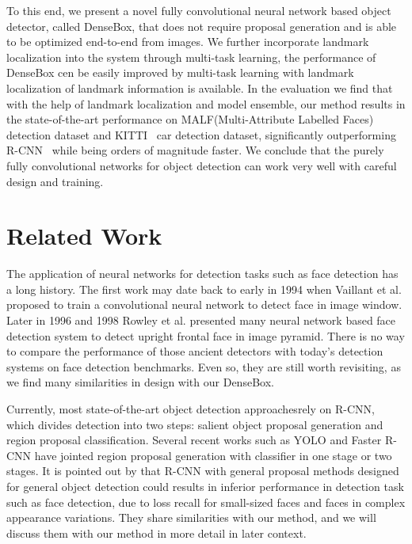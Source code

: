 To this end, we present a novel fully convolutional neural network based object detector, called DenseBox, that does not require proposal generation and is able to be optimized end-to-end from images. We further incorporate landmark localization into the system through multi-task learning, the performance of DenseBox cen be easily improved by multi-task learning with landmark localization of landmark information is available.  In the evaluation we find that with the help of landmark localization and model ensemble, our method results in the state-of-the-art performance on MALF(Multi-Attribute Labelled Faces)~\cite{faceevaluation15} detection dataset and KITTI~\cite{Geiger2012CVPR} car detection dataset, significantly outperforming R-CNN~\cite{} while being orders of magnitude faster. We conclude that the purely fully convolutional networks for object detection can work very well with careful design and training. 

\section{Related Work}

 


The application of neural networks for detection tasks such as face detection has a long history. The first work may date back to early in 1994 when Vaillant et al.\cite{vaillant1994original} proposed to train a convolutional neural network to detect face in image window.  Later in 1996 and 1998 Rowley et al.\cite{rowley1998neural,rowley1998rotation} presented many neural network based face detection system to detect upright frontal face in image pyramid. There is no way to compare the performance of those ancient detectors with today’s detection systems on face detection benchmarks. Even so, they are still worth revisiting, as we find many similarities in design with our DenseBox. 

Currently, most state-of-the-art object detection approaches\cite{ouyang2014deepid, li2015convolutional, erhan2014scalable,girshick2015fast}rely on R-CNN, which divides detection into two steps: salient object proposal generation and region proposal classification. Several recent works such as YOLO and Faster R-CNN have jointed region proposal generation with classifier in one stage or two stages. It is pointed out by \cite{farfade2015multi} that R-CNN with general proposal methods designed for general object detection could results in inferior performance in detection task such as face detection, due to loss recall for small-sized faces and faces in complex appearance variations. They share similarities with our method, and we will discuss them with our method in more detail in later context.  
 
